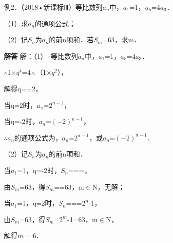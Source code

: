 例2．（2018•新课标Ⅲ）等比数列{\ensuremath{a_{n}}}中，\ensuremath{a_{1}}=1，\ensuremath{a_{5}}=4\ensuremath{a_{3}}．\par
（1）求{\ensuremath{a_{n}}}的通项公式；\par
（2）记\ensuremath{S_{n}}为{\ensuremath{a_{n}}}的前n项和．若\ensuremath{S_{m}}=63，求m．\par
\QuestionSpace{4.8cm}
\ifshowanswers
\par\begingroup\color{solutioncolor}\noindent\textbf{解答}\quad
解：（1）\ensuremath{\because}等比数列{\ensuremath{a_{n}}}中，\ensuremath{a_{1}}=1，\ensuremath{a_{5}}=4\ensuremath{a_{3}}．\par
\ensuremath{\therefore}1\ensuremath{\times}\ensuremath{q^{4}}=4\ensuremath{\times}（1\ensuremath{\times}\ensuremath{q^{2}}），\par
解得q=±2，\par
当q=2时，\ensuremath{a_{n}}=\ensuremath{2^{n-1}}，\par
当q=-2时，\ensuremath{a_{n}}=\ensuremath{(-2)^{n-1}}，\par
\ensuremath{\therefore}{\ensuremath{a_{n}}}的通项公式为，\ensuremath{a_{n}}=\ensuremath{2^{n-1}}，或\ensuremath{a_{n}}=\ensuremath{(-2)^{n-1}}．\par
（2）记\ensuremath{S_{n}}为{\ensuremath{a_{n}}}的前n项和．\par
当\ensuremath{a_{1}}=1，q=-2时，\ensuremath{S_{n}}===，\par
由\ensuremath{S_{m}}=63，得\ensuremath{S_{m}}==63，m\ensuremath{\in}N，无解；\par
当\ensuremath{a_{1}}=1，q=2时，\ensuremath{S_{n}}===\ensuremath{2^{n}}-1，\par
由\ensuremath{S_{m}}=63，得\ensuremath{S_{m}}=\ensuremath{2^{m}}-1=63，m\ensuremath{\in}N，\par
解得$m=6$．\par
\par\endgroup\fi

